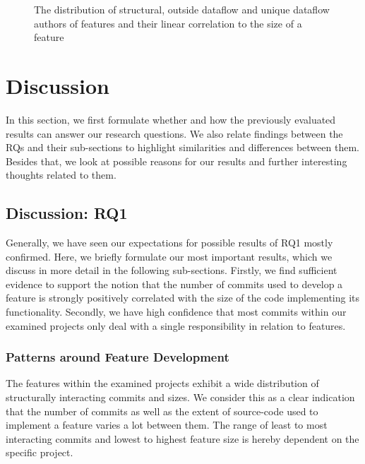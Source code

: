 \begin{figure}[htbp]
  \centering
  
  \caption[Features Interacting with Authors]{The distribution of structural, outside dataflow and unique dataflow authors of features and their linear correlation to the size of a feature}
  \label{fig:author_cfi_plot}
\end{figure}

\clearpage 

\section{Discussion}\label{sec:discussion}

In this section, we first formulate whether and how the previously evaluated results can answer our research questions.
We also relate findings between the RQs and their sub-sections to highlight similarities and differences between them.
Besides that, we look at possible reasons for our results and further interesting thoughts related to them.

\subsection[RQ1]{Discussion: RQ1}\label{sec:disc:RQ1}

Generally, we have seen our expectations for possible results of RQ1 mostly confirmed.
Here, we briefly formulate our most important results, which we discuss in more detail in the following sub-sections.
Firstly, we find sufficient evidence to support the notion that the number of commits used to develop a feature is strongly positively correlated with the size of the code implementing its functionality. 
Secondly, we have high confidence that most commits within our examined projects only deal with a single responsibility in relation to features.

\subsubsection*{Patterns around Feature Development}

The features within the examined projects exhibit a wide distribution of structurally interacting commits and sizes.
We consider this as a clear indication that the number of commits as well as the extent of source-code used to implement a feature varies a lot between them.
The range of least to most interacting commits and lowest to highest feature size is hereby dependent on the specific project.

